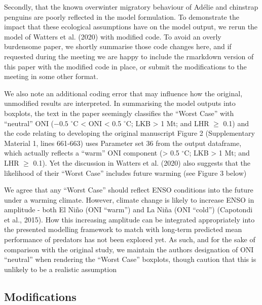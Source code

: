 \documentclass[]{elsarticle} %
\begin{document}
Secondly, that the known overwinter migratory behaviour of Adélie and
chinstrap penguins are poorly reflected in the model formulation. To
demonstrate the impact that these ecological assumptions have on the
model output, we rerun the model of Watters et al. (2020) with modified
code. To avoid an overly burdensome paper, we shortly summarise those
code changes here, and if requested during the meeting we are happy to
include the rmarkdown version of this paper with the modified code in
place, or submit the modifications to the meeting in some other format.

We also note an additional coding error that may influence how the
original, unmodified results are interpreted. In summarising the model
outputs into boxplots, the text in the paper seemingly classifies the
``Worst Case'' with ``neutral'' ONI (\({-0.5}\) \(^{\circ}\)C
\textless{} ONI \textless{} 0.5 \(^{\circ}\)C; LKB \textgreater{} 1 Mt;
and LHR \(\geqslant\) 0.1) and the code relating to developing the
original manuscript Figure 2 (Supplementary Material 1, lines 661-663)
uses Parameter set 36 from the output dataframe, which actually reflects
a ``warm'' ONI component (\textgreater{} 0.5 \(^{\circ}\)C; LKB
\textgreater{} 1 Mt; and LHR \(\geqslant\) 0.1). Yet the discussion in
Watters et al. (2020) also suggests that the likelihood of their ``Worst
Case'' includes future warming (see Figure 3 below)

We agree that any ``Worst Case'' should reflect ENSO conditions into the
future under a warming climate. However, climate change is likely to
increase ENSO in amplitude - both El Niño (ONI ``warm'') and La Niña
(ONI ``cold'') (Capotondi et al., 2015). How this increasing amplitude
can be integrated appropriately into the presented modelling framework
to match with long-term predicted mean performance of predators has not
been explored yet. As such, and for the sake of comparison with the
original study, we maintain the authors designation of ONI ``neutral''
when rendering the ``Worst Case'' boxplots, though caution that this is
unlikely to be a realistic assumption

\hypertarget{modifications}{%
\subsection{Modifications}\label{modifications}}
\end{document}
